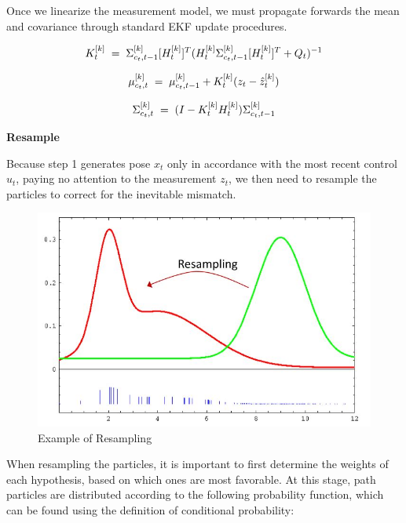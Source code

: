 \documentclass[twoside]{article}
\begin{document}
Once we linearize the measurement model, we must propagate forwards the mean and covariance through standard EKF update procedures.

\begin{equation}
K_t^{[k]} \hspace*{1mm} = \hspace*{1mm} \Sigma_{c_t,t-1}^{[k]}[H_t^{[k]}]^T(H_t^{[k]} \Sigma_{c_t,t-1}^{[k]}[H_t^{[k]}]^T+Q_t)^{-1}
\end{equation}

\begin{equation}
\mu_{c_t,t}^{[k]} \hspace*{1mm} = \hspace*{1mm} \mu_{c_t,t-1}^{[k]}+K_t^{[k]}(z_t-\hat{z}_t^{[k]})
\end{equation}

\begin{equation}
\Sigma_{c_t,t}^{[k]} \hspace*{1mm} = \hspace*{1mm} (I-K_t^{[k]}H_t^{[k]})\Sigma_{c_t,t-1}^{[k]}
\end{equation}

\textbf{Resample}

Because step 1 generates pose $x_{t}$ only in accordance with the most recent control $u_{t}$, paying no attention to the measurement $z_{t}$, we then need to resample the particles to correct for the inevitable mismatch.

\begin{figure}[H]
\centering
\includegraphics[scale=0.5]{Resampling_Figure}
\caption{Example of Resampling}
\end{figure}

When resampling the particles, it is important to first determine the weights of each hypothesis, based on which ones are most favorable.  At this stage, path particles are distributed according to the following probability function, which can be found using the definition of conditional probability:
\end{document}
